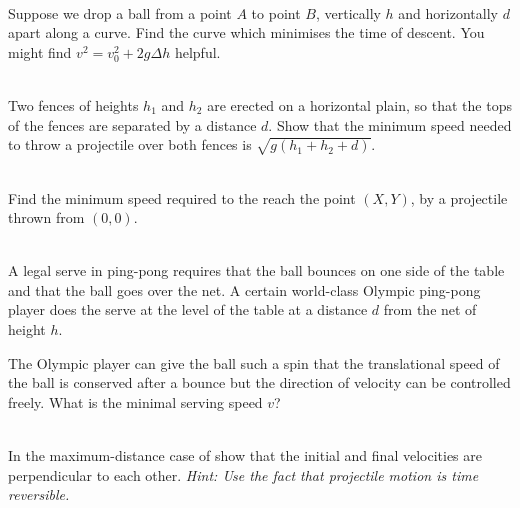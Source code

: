 \begin{exc}
        \begin{exercise}[subtitle={Brachistochrone}, points = 4]
            \smallskip
            ~\\
            Suppose we drop a ball from a point $A$ to point $B$, vertically $h$ and horizontally $d$ apart along a 
            curve. Find the curve which minimises the time of descent. You might find $v^2 = v_0^2 + 2g\Delta h$ helpful.
        \end{exercise}


        \begin{exercise}[subtitle={Jumping over Roofs, Kalda}, points = 3]
            \smallskip
            ~\\
            Two fences of heights $h_1$ and $h_2$ are erected on a horizontal plain, so that the tops
            of the fences are separated by a distance $d$. Show that the minimum speed needed to throw a
            projectile over both fences is $\sqrt{g(h_1 + h_2 + d)}$.
            \label{exc: kaldaroof}
        \end{exercise}


        \begin{exercise}[subtitle={Optimal Projectile}, points = 2]
            \smallskip
            ~\\
            Find the minimum speed required to the reach the point $(X, Y)$, by a projectile thrown 
            from $(0, 0)$.
        \end{exercise}
    
        \begin{exercise}[subtitle={Ping Pong 1, OPhO}, points = 3]
            \smallskip
            ~\\
            A legal serve in ping-pong requires that the ball bounces on one side of the table and
            that the ball goes over the net. A certain world-class Olympic ping-pong player does the serve at the level
            of the table at a distance $d$ from the net of height $h$.
            
            The Olympic player can give
            the ball such a spin that the translational speed of the ball is conserved after a bounce but the direction
            of velocity can be controlled freely. What is the minimal serving speed $v$?
        \end{exercise}

        \begin{exercise}[subtitle={Perpendicular Velocities, Morin}, points = 3]
            \smallskip
            ~\\
            In the maximum-distance case of 
            show that the initial and final velocities are perpendicular to each other. \emph{Hint: Use the fact 
            that projectile motion is time reversible.}
        \end{exercise}


\end{exc}
